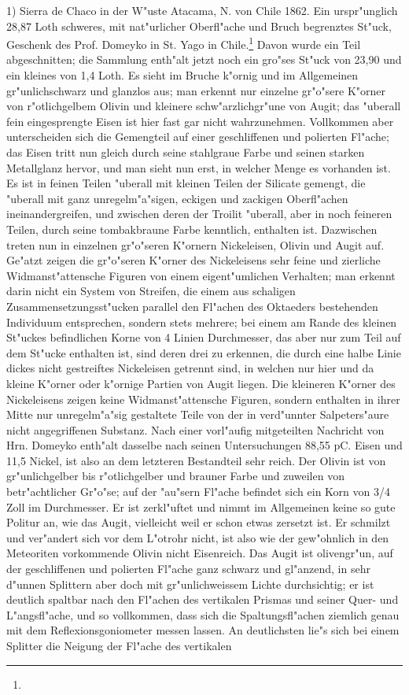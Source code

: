 \documentclass[a4paper, 11pt, oneside]{article}
\begin{document}
1) Sierra de Chaco in der W"uste Atacama, N. von Chile 1862. Ein urspr"unglich 28,87 Loth schweres, mit nat"urlicher Oberfl"ache und Bruch begrenztes St"uck, Geschenk des Prof. Domeyko in St. Yago in Chile.\footnote{} Davon wurde ein Teil abgeschnitten; die Sammlung enth"alt jetzt noch ein gro"ses St"uck von 23,90 und ein kleines von 1,4 Loth. Es sieht im Bruche k"ornig und im Allgemeinen gr"unlichschwarz und glanzlos aus; man erkennt nur einzelne gr"o"sere K"orner von r"otlichgelbem Olivin und kleinere schw"arzlichgr"une von Augit; das "uberall fein eingesprengte Eisen ist hier fast gar nicht wahrzunehmen. Vollkommen aber unterscheiden sich die Gemengteil auf einer geschliffenen und polierten Fl"ache; das Eisen tritt nun gleich durch seine stahlgraue Farbe und seinen starken Metallglanz hervor, und man sieht nun erst, in welcher Menge es vorhanden ist. Es ist in feinen Teilen "uberall mit kleinen Teilen der Silicate gemengt, die "uberall mit ganz unregelm"a"sigen, eckigen und zackigen Oberfl"achen ineinandergreifen, und zwischen deren der Troilit "uberall, aber in noch feineren Teilen, durch seine tombakbraune Farbe kenntlich, enthalten ist. Dazwischen treten nun in einzelnen gr"o"seren K"ornern Nickeleisen, Olivin und Augit auf. Ge"atzt zeigen die gr"o"seren K"orner des Nickeleisens sehr feine und zierliche Widmanst"attensche Figuren von einem eigent"umlichen Verhalten; man erkennt darin nicht ein System von Streifen, die einem aus schaligen Zusammensetzungsst"ucken parallel den Fl"achen des Oktaeders bestehenden Individuum entsprechen, sondern stets mehrere; bei einem am Rande des kleinen St"uckes befindlichen Korne von 4 Linien Durchmesser, das aber nur zum Teil auf dem St"ucke enthalten ist, sind deren drei zu erkennen, die durch eine halbe Linie dickes nicht gestreiftes Nickeleisen getrennt sind, in welchen nur hier und da kleine K"orner oder k"ornige Partien von Augit liegen. Die kleineren K"orner des Nickeleisens zeigen keine Widmanst"attensche Figuren, sondern enthalten in ihrer Mitte nur unregelm"a"sig gestaltete Teile von der in verd"unnter Salpeters"aure nicht angegriffenen Substanz. Nach einer vorl"aufig mitgeteilten Nachricht von Hrn. Domeyko enth"alt dasselbe nach seinen Untersuchungen 88,55 pC. Eisen und 11,5 Nickel, ist also an dem letzteren Bestandteil sehr reich. Der Olivin ist von gr"unlichgelber bis r"otlichgelber und brauner Farbe und zuweilen von betr"achtlicher Gr"o"se; auf der "au"sern Fl"ache befindet sich ein Korn von 3/4 Zoll im Durchmesser. Er ist zerkl"uftet und nimmt im Allgemeinen keine so gute Politur an, wie das Augit, vielleicht weil er schon etwas zersetzt ist. Er schmilzt und ver"andert sich vor dem L"otrohr nicht, ist also wie der gew"ohnlich in den Meteoriten vorkommende Olivin nicht Eisenreich. Das Augit ist olivengr"un, auf der geschliffenen und polierten Fl"ache ganz schwarz und gl"anzend, in sehr d"unnen Splittern aber doch mit gr"unlichweissem Lichte durchsichtig; er ist deutlich spaltbar nach den Fl"achen des vertikalen Prismas und seiner Quer- und L"angsfl"ache, und so vollkommen, dass sich die Spaltungsfl"achen ziemlich genau mit dem Reflexionsgoniometer messen lassen. An deutlichsten lie"s sich bei einem Splitter die Neigung der Fl"ache des vertikalen 
\end{document}
